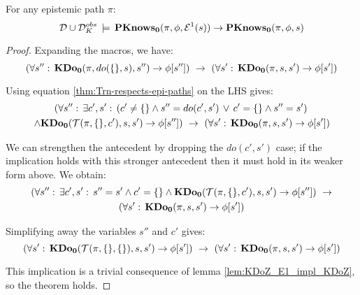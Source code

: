 \begin{thmext}
[\ref{thm:En_impl_En-1}] For any epistemic path $\pi$: \[
\mathcal{D}\cup\mathcal{D}_{K}^{obs}\,\models\,\mathbf{PKnows_{0}}(\pi,\phi,\mathcal{E}^{1}(s))\rightarrow\mathbf{PKnows_{0}}(\pi,\phi,s)\]

\end{thmext}
\begin{proof}
Expanding the macros, we have:\[
\left(\forall s'':\,\mathbf{KDo_{0}}(\pi,do(\{\},s),s'')\rightarrow\phi[s'']\right)\,\,\rightarrow\,\,\left(\forall s':\,\mathbf{KDo_{0}}(\pi,s,s')\rightarrow\phi[s']\right)\]


Using equation \ref{thm:Trn-respects-epi-paths} on the LHS gives:\begin{multline*}
\left(\forall s'':\,\exists c',s':\,\left(c'\neq\{\}\wedge s''=do(c',s')\,\vee\, c'=\{\}\wedge s''=s'\right)\right.\\
\left.\wedge\mathbf{KDo_{0}}(\mathcal{T}(\pi,\{\},c'),s,s')\rightarrow\phi[s'']\right)\,\,\rightarrow\,\,\left(\forall s':\,\mathbf{KDo_{0}}(\pi,s,s')\rightarrow\phi[s']\right)\end{multline*}


We can strengthen the antecedent by dropping the $do(c',s')$ case;
if the implication holds with this stronger antecedent then it must
hold in its weaker form above. We obtain:\begin{multline*}
\left(\forall s'':\,\exists c',s':\, s''=s'\wedge c'=\{\}\wedge\mathbf{KDo_{0}}(\mathcal{T}(\pi,\{\},c'),s,s')\rightarrow\phi[s'']\right)\,\,\rightarrow\\
\left(\forall s':\,\mathbf{KDo_{0}}(\pi,s,s')\rightarrow\phi[s']\right)\end{multline*}


Simplifying away the variables $s''$ and $c'$ gives:\[
\left(\forall s':\,\mathbf{KDo_{0}}(\mathcal{T}(\pi,\{\},\{\}),s,s')\rightarrow\phi[s']\right)\,\,\rightarrow\,\,\left(\forall s':\,\mathbf{KDo_{0}}(\pi,s,s')\rightarrow\phi[s']\right)\]


This implication is a trivial consequence of lemma \ref{lem:KDoZ_E1_impl_KDoZ},
so the theorem holds. 
\end{proof}
\medskip{}


